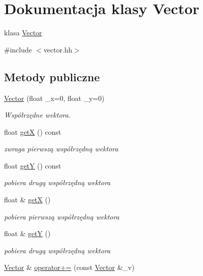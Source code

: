 \hypertarget{class_vector}{\section{Dokumentacja klasy Vector}
\label{class_vector}
}


klasa \hyperlink{class_vector}{Vector}  




{\ttfamily \#include $<$vector.\-hh$>$}

\subsection*{Metody publiczne}
\begin{DoxyCompactItemize}
\item 
\hyperlink{class_vector_af3c1b04bfbb10e29433842202365a6c4}{Vector} (float \-\_\-x=0, float \-\_\-y=0)
\begin{DoxyCompactList}\small\item\em Współrzędne wektora. \end{DoxyCompactList}\item 
float \hyperlink{class_vector_ab2878a1bb81982dc83363646e25ce665}{get\-X} () const 
\begin{DoxyCompactList}\small\item\em zwraga pierwszą współrzędną wektora \end{DoxyCompactList}\item 
float \hyperlink{class_vector_a86293fe7a035979fd252be6071488b6a}{get\-Y} () const 
\begin{DoxyCompactList}\small\item\em pobiera drugą współrzędną wektora \end{DoxyCompactList}\item 
float \& \hyperlink{class_vector_aeca06c929d4ab3078a828723a88621e6}{get\-X} ()
\begin{DoxyCompactList}\small\item\em pobiera pierwszą współrzędną wektora \end{DoxyCompactList}\item 
float \& \hyperlink{class_vector_ab0cc77ce300a60de0ab734555886ad5d}{get\-Y} ()
\begin{DoxyCompactList}\small\item\em pobiera drugą współrzędną wektora \end{DoxyCompactList}\item 
\hyperlink{class_vector}{Vector} \& \hyperlink{class_vector_a4eeab5be24ee846de3012e67a4e34820}{operator+=} (const \hyperlink{class_vector}{Vector} \&\-\_\-v)

\end{DoxyCompactItemize}

